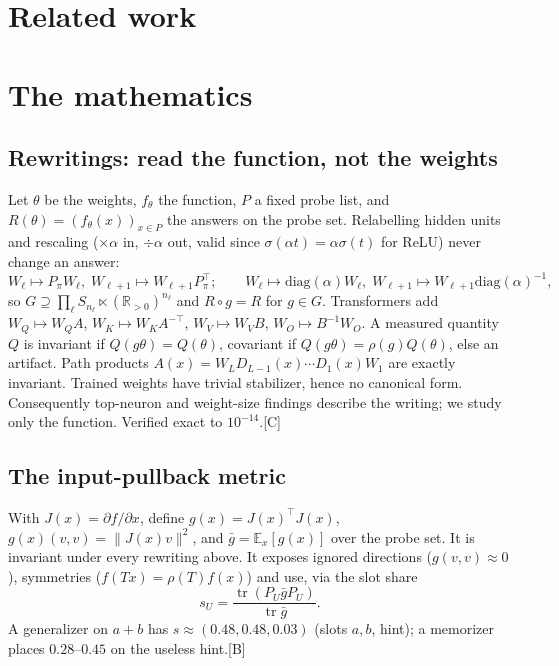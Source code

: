 \documentclass[11pt]{article}
\newcommand{\E}{\mathbb{E}}
\newcommand{\R}{\mathbb{R}}
\newcommand{\tr}{\operatorname{tr}}
\newcommand{\lev}[1]{\textsc{[#1]}}%
\begin{document}
\section{Related work}\label{sec:related}


\section{The mathematics}\label{sec:math}

\subsection{Rewritings: read the function, not the weights}\label{sec:rewrite}
Let $\theta$ be the weights, $f_\theta$ the function, $P$ a fixed probe list, and $R(\theta)=(f_\theta(x))_{x\in P}$ the answers on the probe set. Relabelling hidden units and rescaling ($\times\alpha$ in, $\div\alpha$ out, valid since $\sigma(\alpha t)=\alpha\sigma(t)$ for ReLU) never change an answer:
\[
W_\ell\mapsto P_\pi W_\ell,\; W_{\ell+1}\mapsto W_{\ell+1}P_\pi^{\top};\qquad
W_\ell\mapsto \mathrm{diag}(\alpha)W_\ell,\; W_{\ell+1}\mapsto W_{\ell+1}\mathrm{diag}(\alpha)^{-1},
\]
so $G\supseteq\prod_\ell S_{n_\ell}\ltimes(\R_{>0})^{n_\ell}$ and $R\circ g=R$ for $g\in G$. Transformers add $W_Q\mapsto W_QA$, $W_K\mapsto W_KA^{-\top}$, $W_V\mapsto W_VB$, $W_O\mapsto B^{-1}W_O$. A measured quantity $Q$ is invariant if $Q(g\theta)=Q(\theta)$, covariant if $Q(g\theta)=\rho(g)Q(\theta)$, else an artifact. Path products $A(x)=W_LD_{L-1}(x)\cdots D_1(x)W_1$ are exactly invariant. Trained weights have trivial stabilizer, hence no canonical form. Consequently top-neuron and weight-size findings describe the writing; we study only the function. Verified exact to $10^{-14}$.\hfill\lev{C}

\subsection{The input-pullback metric}
With $J(x)=\partial f/\partial x$, define $g(x)=J(x)^{\top}J(x)$, $g(x)(v,v)=\|J(x)v\|^2$, and $\bar g=\E_x[g(x)]$ over the probe set. It is invariant under every rewriting above. It exposes ignored directions ($g(v,v)\approx 0$), symmetries ($f(Tx)=\rho(T)f(x)$) and use, via the slot share
\[
s_U=\frac{\tr(P_U\bar g P_U)}{\tr\bar g}.
\]
A generalizer on $a+b$ has $s\approx(0.48,0.48,0.03)$ (slots $a,b$, hint); a memorizer places $0.28$--$0.45$ on the useless hint.\hfill\lev{B}
\end{document}
